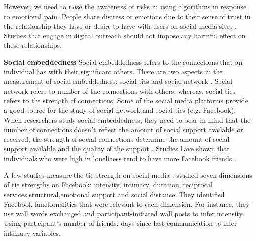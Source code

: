 However, we need to raise the awareness of risks in using algorithms in response to emotional pain. People share distress or emotions due to their sense of trust in the relationship they have or desire to have with users on social media sites \cite{brownlie2018looking}. Studies that engage in digital outreach should not impose any harmful effect on these relationships.

\textbf{Social embeddedness}
Social embeddedness refers to the connections that an individual has with their significant others. There are two aspects in the measurement of social embeddedness: social ties and social network \cite{sarason1983assessing}. Social network refers to number of the connections with others, whereas, social ties refers to the strength of connections. Some of the social media platforms provide a good source for the study of social network and social ties (e.g. Facebook). When researchers study social embeddedness, they need to bear in mind that the number of connections doesn't reflect the amount of social support available or received, the strength of social connections determine the amount of social support available and the quality of the support \cite{burke2010social}. Studies have shown that individuals who were high in loneliness tend to have more Facebook friends \cite{skues_effects_2012}.  

A few studies measure the tie strength on social media \cite{xiang2010modeling}. \citet{gilbert2009predicting} studied seven dimensions of tie strengths on Facebook: intensity, intimacy, duration, reciprocal services,structural,emotional support and social distance. They identified Facebook functionalities that were relevant to each dimension. For instance, they use wall words exchanged and participant-initiated wall posts to infer intensity. Using participant’s number of friends, days since last communication to infer intimacy variables. 


